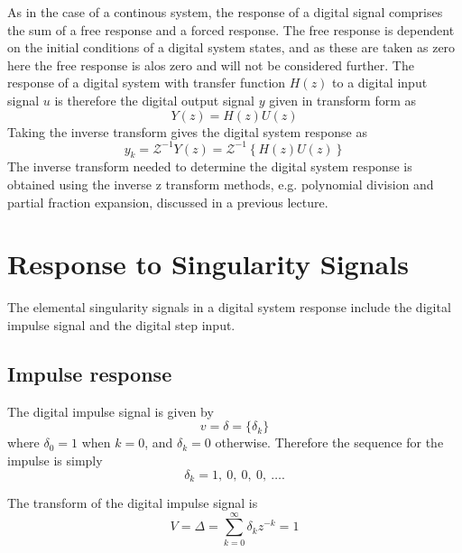 \def\FileDate{98/11/25}
\def\FileVersion{1.0}

As in the case of a continous system, the response of a digital
signal comprises the sum of a free response and a forced response.
The free response is dependent on the initial conditions of a
digital system states, and as these are taken as zero here the
free response is alos zero and will not be considered further. The
response of a digital system with transfer function $H(z)$ to a
digital input signal $u$ is therefore the digital output signal
$y$ given in transform form as
\begin{equation}\label{eq:l10e1}
  Y(z) =H(z) U(z)
\end{equation}
Taking the inverse transform gives the digital system response as
\begin{equation}\label{eq:l10e2}
  y_k = \mathcal{Z}^{-1}Y(z) = \mathcal{Z}^{-1} \left\{H(z)
  U(z)\right\}
\end{equation}
The inverse transform needed to determine the digital system
response is obtained using the inverse z transform methods, e.g.
polynomial division and partial fraction expansion, discussed in a
previous lecture.

\section*{Response to Singularity Signals}

The elemental singularity signals in a digital system response
include the digital impulse signal and the digital step input.

\subsection*{Impulse response}
The digital impulse signal is given by
\begin{equation}\label{eq:l10e3}
  v = \delta = \{\delta_k\}
\end{equation}
where $\delta_0 = 1$ when $k = 0$, and $\delta_k = 0$ otherwise.
Therefore the sequence for the impulse is simply
\[\delta_k = 1,\ 0,\ 0,\ 0,\ \ldots.\]

The transform of the digital impulse signal is
\begin{equation}\label{eq:l10e4}
  V = \Delta = \sum_{k=0}^{\infty}\delta_k z^{-k} = 1
\end{equation}

